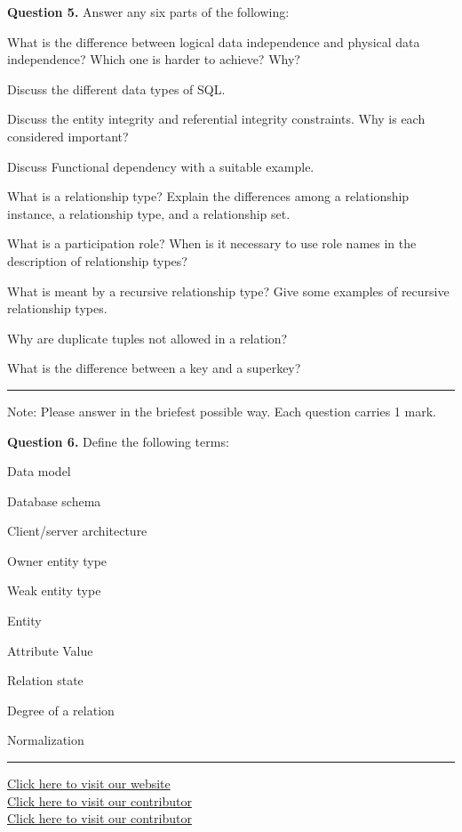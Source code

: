 \documentclass[11pt,a4paper]{article}
\begin{document}
\noindent   \textbf{Question 5.} Answer any six parts of the following:

\begin{parts}
  \item What is the difference between logical data independence and physical data independence? Which one is harder to achieve? Why?
  \item Discuss the different data types of SQL.
  \item Discuss the entity integrity and referential integrity constraints. Why is each considered important?
  \item Discuss Functional dependency with a suitable example.
  \item What is a relationship type? Explain the differences among a relationship instance, a relationship type, and a relationship set.
  \item What is a participation role? When is it necessary to use role names in the description of relationship types?
  \item What is meant by a recursive relationship type? Give some examples of recursive relationship types.
  \item Why are duplicate tuples not allowed in a relation?
  \item What is the difference between a key and a superkey?
\end{parts}

\bigskip


\rule{\linewidth}{0.4pt}\smallskip

Note: Please answer in the briefest possible way. Each question carries 1 mark.

\medskip


\noindent   \textbf{Question 6.} Define the following terms:

\begin{parts}
  \item Data model
  \item Database schema
  \item Client/server architecture
  \item Owner entity type
  \item Weak entity type
  \item Entity
  \item Attribute Value
  \item Relation state
  \item Degree of a relation
  \item Normalization
\end{parts}

\vfill
\rule{\linewidth}{0.4pt}

\begin{center}\small
\href{https://bhu-exam.vercel.app/}{Click here to visit our website}\\[4pt]\href{https://me-aryan.vercel.app/}{Click here to visit our contributor}\\[4pt]\href{https://quashan-me.vercel.app/}{Click here to visit our contributor}
\end{center}
\end{document}
